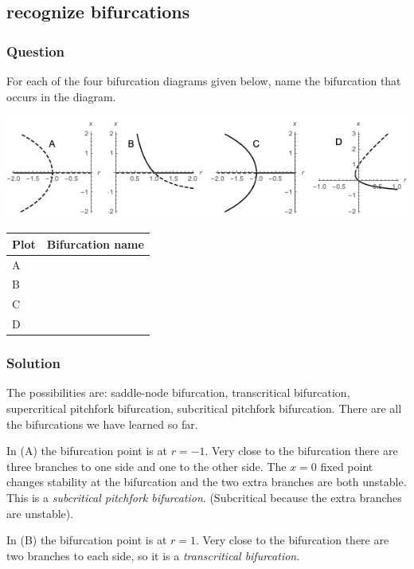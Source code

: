 \documentclass[12pt,letterpaper,noanswers]{exam}
\begin{document}
\subsection{recognize bifurcations}

\subsubsection{Question}
For each of the four bifurcation diagrams given below, name the bifurcation that occurs in the diagram.

\includegraphics[width=\linewidth]{img/C04-2019-09-11bifn.png}


\bgroup
\def\arraystretch{2}
\begin{tabular}{|l|p{10cm}|}
\hline
Plot     & \hspace{0.5cm} Bifurcation name \\
\hline\hline
 A    & \\
 \hline
 B & \\
 \hline
 C & \\
 \hline
 D & \\
 \hline
\end{tabular}
\egroup

\subsubsection{Solution} 

The possibilities are: saddle-node bifurcation, transcritical bifurcation, supercritical pitchfork bifurcation, subcritical pitchfork bifurcation.  There are all the bifurcations we have learned so far.

In (A) the bifurcation point is at $r = -1$.  Very close to the bifurcation there are three branches to one side and one to the other side.  The $x=0$ fixed point changes stability at the bifurcation and the two extra branches are both unstable.  This is a \emph{subcritical pitchfork bifurcation}.  (Subcritical because the extra branches are unstable).

In (B) the bifurcation point is at $r = 1$.  Very close to the bifurcation there are two branches to each side, so it is a \emph{transcritical bifurcation}.
\end{document}
